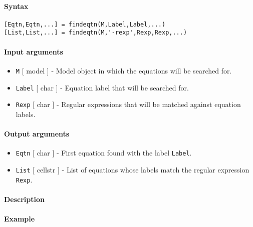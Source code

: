 


	\paragraph{Syntax}

\begin{verbatim}
[Eqtn,Eqtn,...] = findeqtn(M,Label,Label,...)
[List,List,...] = findeqtn(M,'-rexp',Rexp,Rexp,...)
\end{verbatim}

\paragraph{Input arguments}

\begin{itemize}
\item
  \texttt{M} {[} model {]} - Model object in which the equations will be
  searched for.
\item
  \texttt{Label} {[} char {]} - Equation label that will be searched
  for.
\item
  \texttt{Rexp} {[} char {]} - Regular expressions that will be matched
  against equation labels.
\end{itemize}

\paragraph{Output arguments}

\begin{itemize}
\item
  \texttt{Eqtn} {[} char {]} - First equation found with the label
  \texttt{Label}.
\item
  \texttt{List} {[} cellstr {]} - List of equations whose labels match
  the regular expression \texttt{Rexp}.
\end{itemize}

\paragraph{Description}

\paragraph{Example}


